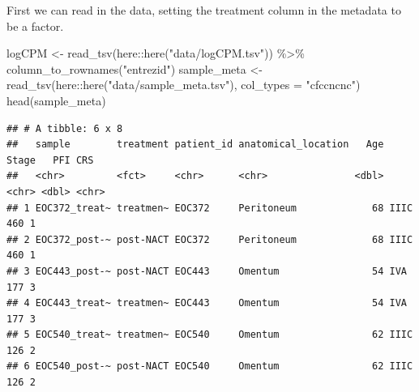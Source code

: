 \documentclass[9pt,a4paper,]{extarticle}
\newenvironment{Shaded}{\begin{snugshade}}{\end{snugshade}}
\newcommand{\AttributeTok}[1]{\textcolor[rgb]{0.77,0.63,0.00}{#1}}
\newcommand{\FunctionTok}[1]{\textcolor[rgb]{0.00,0.00,0.00}{#1}}
\newcommand{\NormalTok}[1]{#1}
\newcommand{\OtherTok}[1]{\textcolor[rgb]{0.56,0.35,0.01}{#1}}
\newcommand{\SpecialCharTok}[1]{\textcolor[rgb]{0.00,0.00,0.00}{#1}}
\newcommand{\StringTok}[1]{\textcolor[rgb]{0.31,0.60,0.02}{#1}}
\begin{document}
First we can read in the data, setting the treatment column in the metadata to be a factor.

\begin{Shaded}
\begin{Highlighting}[]
\NormalTok{logCPM }\OtherTok{\textless{}{-}} \FunctionTok{read\_tsv}\NormalTok{(here}\SpecialCharTok{::}\FunctionTok{here}\NormalTok{(}\StringTok{"data/logCPM.tsv"}\NormalTok{)) }\SpecialCharTok{\%\textgreater{}\%}
    \FunctionTok{column\_to\_rownames}\NormalTok{(}\StringTok{"entrezid"}\NormalTok{)}
\NormalTok{sample\_meta }\OtherTok{\textless{}{-}} \FunctionTok{read\_tsv}\NormalTok{(here}\SpecialCharTok{::}\FunctionTok{here}\NormalTok{(}\StringTok{"data/sample\_meta.tsv"}\NormalTok{), }\AttributeTok{col\_types =} \StringTok{"cfccncnc"}\NormalTok{)}
\FunctionTok{head}\NormalTok{(sample\_meta)}
\end{Highlighting}
\end{Shaded}

\begin{verbatim}
## # A tibble: 6 x 8
##   sample        treatment patient_id anatomical_location   Age Stage   PFI CRS  
##   <chr>         <fct>     <chr>      <chr>               <dbl> <chr> <dbl> <chr>
## 1 EOC372_treat~ treatmen~ EOC372     Peritoneum             68 IIIC    460 1    
## 2 EOC372_post-~ post-NACT EOC372     Peritoneum             68 IIIC    460 1    
## 3 EOC443_post-~ post-NACT EOC443     Omentum                54 IVA     177 3    
## 4 EOC443_treat~ treatmen~ EOC443     Omentum                54 IVA     177 3    
## 5 EOC540_treat~ treatmen~ EOC540     Omentum                62 IIIC    126 2    
## 6 EOC540_post-~ post-NACT EOC540     Omentum                62 IIIC    126 2
\end{verbatim}
\end{document}

